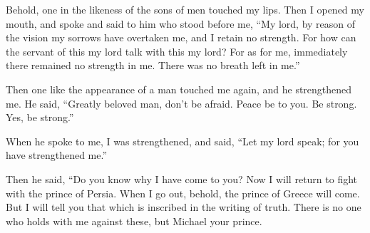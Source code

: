 {Behold, one in the likeness of the sons of men touched my lips. Then I opened my mouth, and spoke and said to him who stood before me, “My lord, by reason of the vision my sorrows have overtaken me, and I retain no strength.
For how can the servant of this my lord talk with this my lord? For as for me, immediately there remained no strength in me. There was no breath left in me.”
\par }{\PP {}Then one like the appearance of a man touched me again, and he strengthened me.
He said, “Greatly beloved man, don’t be afraid. Peace be to you. Be strong. Yes, be strong.”
\par }{\PP When he spoke to me, I was strengthened, and said, “Let my lord speak; for you have strengthened me.”
\par }{\PP {}Then he said, “Do you know why I have come to you? Now I will return to fight with the prince of Persia. When I go out, behold, the prince of Greece will come.
But I will tell you that which is inscribed in the writing of truth. There is no one who holds with me against these, but Michael your prince.

}
